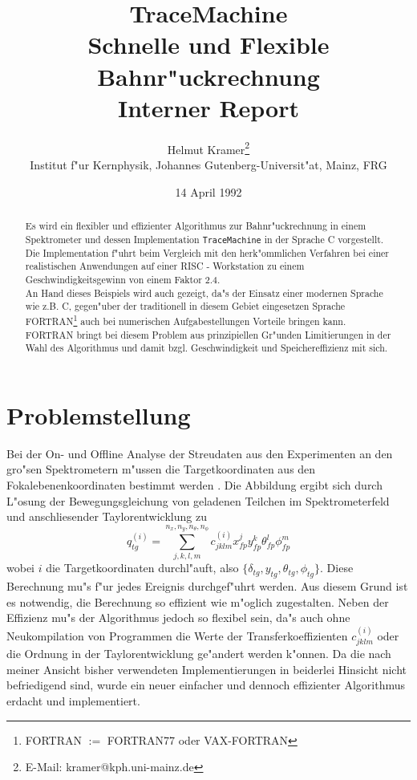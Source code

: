 
\date{14 April 1992}
\title{
        TraceMachine \\
        Schnelle und Flexible Bahnr"uckrechnung \\
        Interner Report
}
\author {Helmut Kramer\thanks{E-Mail:
kramer@kph.uni-mainz.de} \\
Institut f"ur Kernphysik, 
Johannes Gutenberg-Universit"at,  Mainz, FRG
}
\maketitle
\begin{abstract}
Es wird ein  flexibler und effizienter Algorithmus
zur Bahnr"uckrechnung in einem Spektrometer und dessen 
Implementation {\tt TraceMachine}
in der Sprache C vorgestellt. 
Die Implementation f"uhrt beim Vergleich mit den herk"ommlichen  
Verfahren bei einer realistischen Anwendungen auf einer RISC - Workstation 
zu einem Geschwindigkeitsgewinn von einem
Faktor 2.4.\\
An Hand dieses Beispiels wird auch gezeigt, da"s der Einsatz
einer modernen Sprache wie z.B. C, gegen"uber der traditionell in diesem
Gebiet eingesetzen Sprache 
FORTRAN\footnote{FORTRAN $ := $ FORTRAN77 oder VAX-FORTRAN} auch bei
numerischen Aufgabestellungen Vorteile bringen kann. 
FORTRAN bringt bei diesem Problem aus prinzipiellen Gr"unden 
Limitierungen in der Wahl des Algorithmus und damit bzgl. Geschwindigkeit 
und Speichereffizienz  mit sich.
\end{abstract}
\section{Problemstellung}
Bei der On- und Offline Analyse der Streudaten aus den Experimenten an
den gro"sen Spektrometern m"ussen die Targetkoordinaten aus den
Fokalebenenkoordinaten bestimmt werden \cite{eo}. Die Abbildung
ergibt sich durch L"osung  der Bewegungsgleichung von geladenen Teilchen
im Spektrometerfeld und anschliesender Taylorentwicklung zu
\begin{equation}
        q_{tg}^{(i)} = 
        \sum_{j,k,l,m}^{n_{x}, n_{y}, n_{\theta }, n_{\phi}}    
         c_{jklm}^{(i)} x_{fp}^j y_{fp}^k \theta _{fp}^l \phi _{fp} ^m
\label{taylor}
\end{equation}
wobei $ i $ die Targetkoordinaten durchl"auft,  also 
$\{\delta _{tg} , y_{tg},\theta _{tg} , \phi _{tg} \}. $
Diese Berechnung mu"s f"ur jedes Ereignis durchgef"uhrt werden. 
Aus diesem Grund ist es notwendig, die Berechnung so effizient wie m"oglich 
zugestalten. 
Neben der Effizienz mu"s der Algorithmus  jedoch
so flexibel sein, da"s auch ohne Neukompilation von Programmen
die Werte der Transferkoeffizienten $ c_{jklm}^{(i)} $
oder die Ordnung in der Taylorentwicklung ge"andert werden k"onnen.
Da die nach meiner Ansicht bisher verwendeten 
Implementierungen in beiderlei Hinsicht nicht befriedigend sind,  wurde
ein neuer einfacher und dennoch effizienter Algorithmus erdacht und 
implementiert.

